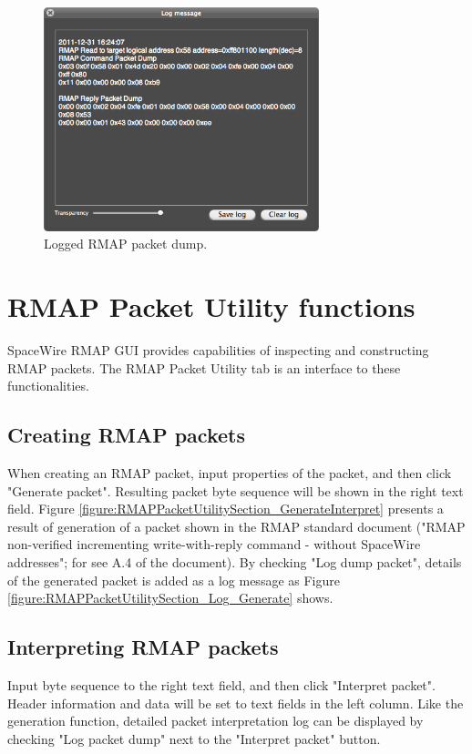 \documentclass[a4paper,10pt]{article}
\begin{document}
\begin{figure}[htb]
\begin{center}
\includegraphics[width=8cm]{figures/SpaceWireRMAPGUI/RMAPSection_LogRMAPPacketDump.png}
\vspace{-2mm}
\caption{Logged RMAP packet dump.}
\label{figure:RMAPSection_LogRMAPPacketDump}
\end{center}
\end{figure}


\section{RMAP Packet Utility functions}
SpaceWire RMAP GUI provides capabilities of inspecting and constructing RMAP packets.
The RMAP Packet Utility tab is an interface to these functionalities.

\subsection{Creating RMAP packets}
When creating an RMAP packet, input properties of the packet, and then click "Generate packet".
Resulting packet byte sequence will be shown in the right text field.
Figure \ref{figure:RMAPPacketUtilitySection_GenerateInterpret} presents a result of generation of a packet shown in the RMAP standard document ("RMAP non-verified incrementing write-with-reply command - without SpaceWire addresses"; for see A.4 of the document).
By checking "Log dump packet", details of the generated packet is added as a log message as Figure \ref{figure:RMAPPacketUtilitySection_Log_Generate} shows.

\subsection{Interpreting RMAP packets}
Input byte sequence to the right text field, and then click "Interpret packet". Header information and data will be set to text fields in the left column. 
Like the generation function, detailed packet interpretation log can be displayed by checking "Log packet dump" next to the "Interpret packet" button.
\end{document}
